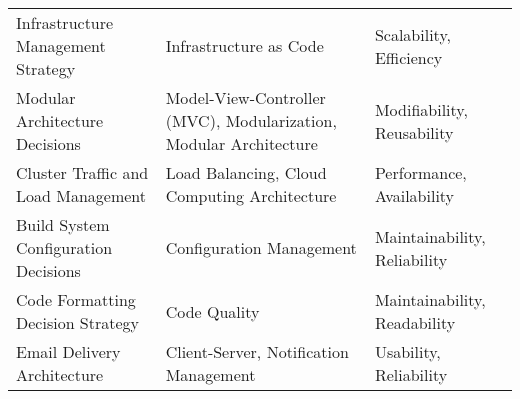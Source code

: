 {\begin{longtable}{|p{5cm}p{6cm}p{3cm}|}
        Infrastructure Management Strategy & Infrastructure as Code & Scalability, Efficiency \\
        Modular Architecture Decisions & Model-View-Controller (MVC), Modularization, Modular Architecture & Modifiability, Reusability \\
        Cluster Traffic and Load Management & Load Balancing, Cloud Computing Architecture & Performance, Availability \\
        Build System Configuration Decisions & Configuration Management & Maintainability, Reliability \\
        Code Formatting Decision Strategy & Code Quality & Maintainability, Readability \\
        Email Delivery Architecture & Client-Server, Notification Management & Usability, Reliability \\
        \hline
    \end{longtable}
}